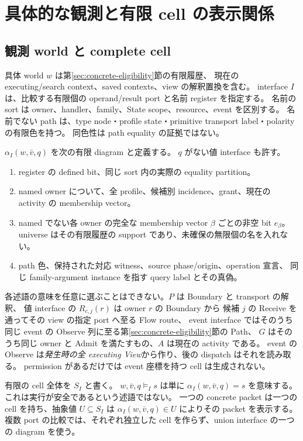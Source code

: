 \documentclass[11pt,a4paper]{article}
\begin{document}
\section{具体的な観測と有限 cell の表示関係}
\label{sec:representation}

\subsection{観測 world と complete cell}

具体 world \(w\) は第\ref{sec:concrete-eligibility}節の有限履歴、
現在の executing/search context、saved contexts、view の解釈置換を含む。
interface \(I\) は、比較する有限個の operand/result port と名前 register を指定する。
名前の sort は owner、handler、family、State scope、resource、event を区別する。
名前でない path は、type node・profile state・primitive transport label・polarity の有限色を持つ。
同色性は path equality の証拠ではない。

\(\alpha_I(w,\bar v,q)\) を次の有限 diagram と定義する。
\(q\) がない値 interface も許す。
\begin{enumerate}
\item register の defined bit、同じ sort 内の実際の equality partition。
\item named owner について、全 profile、候補別 incidence、grant、現在の activity の membership vector。
\item named でない各 owner の完全な membership vector \(\beta\) ごとの非空 bit \(e_\beta\)。
      universe はその有限履歴の support であり、未確保の無限個の名を入れない。
\item path 色、保持された対応 witness、source phase/origin、operation 宣言、
      同じ family-argument instance を指す query label とその真偽。
\end{enumerate}
各述語の意味を任意に選ぶことはできない。\(P\) は Boundary と transport の解釈、
値 interface の \(R_{c,j}(r)\) は owner \(r\) の Boundary から
候補 \(j\) の Receive を通ってその view の指定 port へ至る Flow route、
event interface ではそのうち同じ event の Observe 列に至る第\ref{sec:concrete-eligibility}節の Path、
\(G\) はそのうち同じ owner と Admit を満たすもの、\(A\) は現在の activity である。
event の Observe は\emph{発生時の全 executing View}から作り、後の dispatch はそれを読み取る。
permission があるだけでは event 座標を持つ cell は生成されない。

有限の cell 全体を \(S_I\) と書く。
\(w,\bar v,q\models_I s\) は単に \(\alpha_I(w,\bar v,q)=s\) を意味する。
これは実行が安全であるという述語ではない。
一つの concrete packet は一つの cell を持ち、抽象値 \(U\subseteq S_I\) は
\(\alpha_I(w,\bar v,q)\in U\) によりその packet を表示する。
複数 port の比較では、それぞれ独立した cell を作らず、union interface の一つの diagram を使う。
\end{document}
